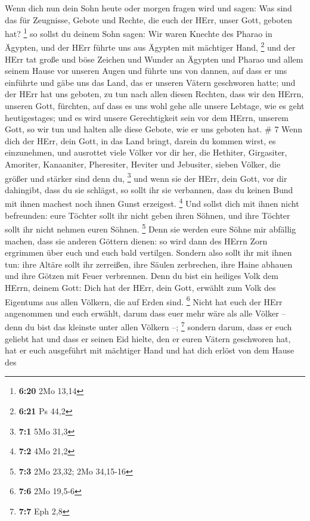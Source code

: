  Wenn dich nun dein Sohn heute oder morgen fragen wird und
sagen: Was sind das für Zeugnisse, Gebote und Rechte, die euch der HErr,
unser Gott, geboten hat? \footnote{\textbf{6:20} 2Mo 13,14}
 so sollst du deinem Sohn sagen: Wir waren Knechte des
Pharao in Ägypten, und der HErr führte uns aus Ägypten mit mächtiger
Hand, \footnote{\textbf{6:21} Ps 44,2}  und der HErr tat
große und böse Zeichen und Wunder an Ägypten und Pharao und allem seinem
Hause vor unseren Augen  und führte uns von dannen, auf
dass er uns einführte und gäbe uns das Land, das er unseren Vätern
geschworen hatte;  und der HErr hat uns geboten, zu tun
nach allen diesen Rechten, dass wir den HErrn, unseren Gott, fürchten,
auf dass es uns wohl gehe alle unsere Lebtage, wie es geht
heutigestages;  und es wird unsere Gerechtigkeit sein vor
dem HErrn, unserem Gott, so wir tun und halten alle diese Gebote, wie er
uns geboten hat. \# 7  Wenn dich der HErr, dein Gott, in das
Land bringt, darein du kommen wirst, es einzunehmen, und ausrottet viele
Völker vor dir her, die Hethiter, Girgasiter, Amoriter, Kanaaniter,
Pheresiter, Heviter und Jebusiter, sieben Völker, die größer und stärker
sind denn du, \footnote{\textbf{7:1} 5Mo 31,3}  und wenn sie
der HErr, dein Gott, vor dir dahingibt, dass du sie schlägst, so sollt
ihr sie verbannen, dass du keinen Bund mit ihnen machest noch ihnen
Gunst erzeigest. \footnote{\textbf{7:2} 4Mo 21,2}  Und
sollst dich mit ihnen nicht befreunden: eure Töchter sollt ihr nicht
geben ihren Söhnen, und ihre Töchter sollt ihr nicht nehmen euren
Söhnen. \footnote{\textbf{7:3} 2Mo 23,32; 2Mo 34,15-16} 
Denn sie werden eure Söhne mir abfällig machen, dass sie anderen Göttern
dienen: so wird dann des HErrn Zorn ergrimmen über euch und euch bald
vertilgen.  Sondern also sollt ihr mit ihnen tun: ihre
Altäre sollt ihr zerreißen, ihre Säulen zerbrechen, ihre Haine abhauen
und ihre Götzen mit Feuer verbrennen.  Denn du bist ein
heiliges Volk dem HErrn, deinem Gott: Dich hat der HErr, dein Gott,
erwählt zum Volk des Eigentums aus allen Völkern, die auf Erden sind.
\footnote{\textbf{7:6} 2Mo 19,5-6}  Nicht hat euch der HErr
angenommen und euch erwählt, darum dass euer mehr wäre als alle Völker
-- denn du bist das kleinste unter allen Völkern --; \footnote{\textbf{7:7}
  Eph 2,8}  sondern darum, dass er euch geliebt hat und dass
er seinen Eid hielte, den er euren Vätern geschworen hat, hat er euch
ausgeführt mit mächtiger Hand und hat dich erlöst von dem Hause des
